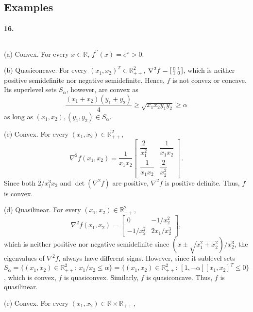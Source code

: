 \subsection{Examples}
  \paragraph{16.}
  \begin{solution}
    $\,$\par
    (a) Convex. For every $x\in\mathbb{R}$, $f^{\prime\prime}(x)=e^x>0$.\par
    (b) Quasiconcave. For every $(x_1,x_2)^T\in\mathbb{R}_{++}^2$, $\nabla^2f=
    \begin{bsmallmatrix} 0 & 1 \\ 1 & 0\end{bsmallmatrix}$, which is neither
    positive semidefinite nor negative semidefinite. Hence, $f$ is not convex or
    concave. Its superlevel sets $S_\alpha$, however, are convex as
    \[
      \frac{(x_1+x_2)(y_1+y_2)}{4} \ge \sqrt{x_1x_2y_1y_2} \ge \alpha
    \]
    as long as $(x_1,x_2),(y_1,y_2)\in S_\alpha$.\par
    (c) Convex. For every $(x_1,x_2)\in \mathbb{R}_{++}^2$, 
    \[
      \nabla^2f(x_1,x_2) = \frac{1}{x_1x_2}
      \begin{bmatrix}
        \dfrac{2}{x_1^2} & \dfrac{1}{x_1x_2} \\
        \dfrac{1}{x_1x_2} & \dfrac{2}{x_2^2}
      \end{bmatrix}.
    \]
    Since both $2/x_1^3x_2$ and $\det(\nabla^2 f)$ are positive, $\nabla^2 f$ is
    positive definite. Thus, $f$ is convex.\par
    (d) Quasilinear. For every $(x_1, x_2)\in\mathbb{R}_{++}^2$,
    \[
      \nabla^2f(x_1,x_2) = \begin{bmatrix}
        0 & -1/x_2^2 \\ -1/x_2^2 & 2x_1/x_2^3
      \end{bmatrix},
    \]
    which is neither positive nor negative semidefinite since $(x\pm\sqrt{x_1^2+
    x_2^2})/x_2^3$, the eigenvalues of $\nabla^2f$, always have different signs.
    However, since it sublevel sets $S_\alpha=\{(x_1,x_2)\in\mathbb{R}_{++}^2:\,
    x_1/x_2\le\alpha\}=\{(x_1,x_2)\in\mathbb{R}_{++}^2:\,[1,-\alpha][x_1,x_2]^T
    \le 0\}$, which is convex, $f$ is quasiconvex. Similarly, $f$ is 
    quasiconcave. Thus, $f$ is quasilinear.\par
    (e) Convex. For every $(x_1,x_2)\in\mathbb{R}\times\mathbb{R}_{++}$,
    \[
\]
\end{solution}
